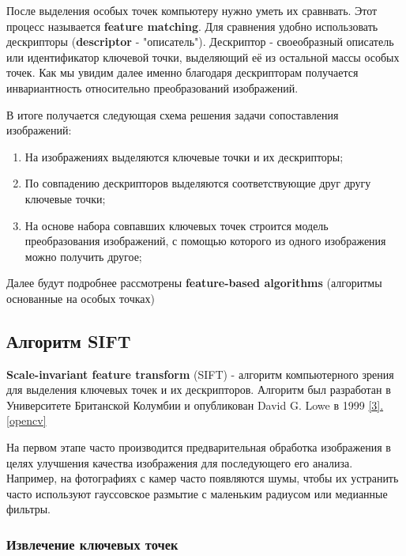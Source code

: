 После выделения особых точек компьютеру нужно уметь их сравнвать. Этот процесс называется \textbf{feature matching}. Для сравнения удобно использовать дескрипторы (\textbf{descriptor} - "описатель"). Дескриптор - своеобразный описатель или идентификатор ключевой точки, выделяющий её из остальной массы особых точек. Как мы увидим далее именно благодаря дескрипторам получается инвариантность относительно преобразований изображений. 
\vspace{1em}

В итоге получается следующая схема решения задачи сопоставления изображений:
\begin{enumerate}
    \item На изображениях выделяются ключевые точки и их дескрипторы;
    \item По совпадению дескрипторов выделяются соответствующие друг другу ключевые точки;
    \item На основе набора совпавших ключевых точек строится модель преобразования изображений, с помощью которого из одного изображения можно получить другое;
\end{enumerate}

Далее будут подробнее рассмотрены \textbf{feature-based algorithms} (алгоритмы основанные на особых точках)

\subsection*{Алгоритм SIFT}   

\tab \textbf{Scale-invariant feature transform} (SIFT) - алгоритм компьютерного зрения для выделения ключевых точек и их дескрипторов. Алгоритм был разработан в Университете Британской Колумбии и опубликован David G. Lowe в 1999 \hyperref[lowe]{[3]. \ref{opencv} }
    
\vspace{1em}

На первом этапе часто производится предварительная обработка изображения в целях улучшения качества изображения для последующего его анализа. Например, на фотографиях с камер часто появляются шумы, чтобы их устранить часто используют гауссовское размытие с маленьким радиусом или медианные фильтры.

\subsubsection*{Извлечение ключевых точек}

